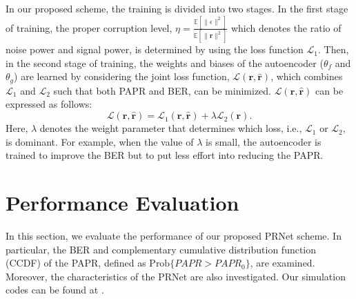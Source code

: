 \documentclass[journal]{IEEEtran}
\begin{document}
In our proposed scheme, the training is divided into two stages. In the first stage of training, the proper corruption level, $\eta = \frac{\mathbb{E}[\|\epsilon\|^2]}{\mathbb{E}[\|\boldsymbol{r}\|^2]}$ which denotes the ratio of noise power and signal power, is determined by using the loss function $\mathcal{L}_1$. Then, in the second stage of training, the weights and biases of the autoencoder ($\theta_f$ and $\theta_g$) are learned by considering the joint loss function, $\mathcal{L}(\boldsymbol{r}, \hat{\boldsymbol{r}})$, which combines $\mathcal{L}_1$ and $\mathcal{L}_2$ such that both PAPR and BER, can be minimized. $\mathcal{L}(\boldsymbol{r}, \hat{\boldsymbol{r}})$ can be expressed as follows:
\begin{equation}
\mathcal{L}(\boldsymbol{r}, \hat{\boldsymbol{r}}) = \mathcal{L}_1(\boldsymbol{r}, \hat{\boldsymbol{r}}) + \lambda \mathcal{L}_2(\boldsymbol{r}) .
\label{eq7}
\end{equation}
Here, $\lambda$ denotes the weight parameter that determines which loss, i.e., $\mathcal{L}_1$ or $\mathcal{L}_2$, is dominant. For example, when the value of $\lambda$ is small, the autoencoder is trained to improve the BER but to put less effort into reducing the PAPR.

\section{Performance Evaluation}
In this section, we evaluate the performance of our proposed PRNet scheme. In particular, the BER and complementary cumulative distribution function (CCDF) of the PAPR, defined as $\text{Prob}\{PAPR > PAPR_0\}$, are examined. Moreover, the characteristics of the PRNet are also investigated. Our simulation codes can be found at \cite{b15}.
\end{document}
